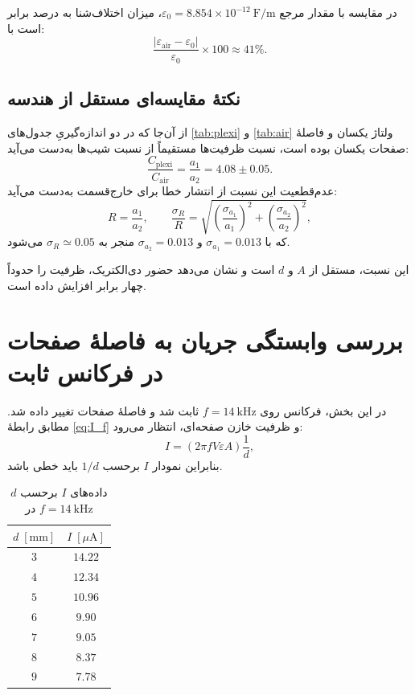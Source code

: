 \documentclass[a4paper, 11pt]{article}
\begin{document}
در مقایسه با مقدار مرجع $\varepsilon_0=8.854\times 10^{-12}\ \mathrm{F/m}$، میزان اختلاف‌شنا به درصد برابر است با:
\[
\frac{|\varepsilon_{\mathrm{air}}-\varepsilon_0|}{\varepsilon_0}\times 100
\approx 41\%.
\]

\subsection*{نکتهٔ مقایسه‌ای مستقل از هندسه}
از آن‌جا که در دو اندازه‌گیریِ جدول‌های \ref{tab:plexi} و \ref{tab:air} ولتاژ یکسان و فاصلهٔ صفحات یکسان بوده است، نسبت ظرفیت‌ها مستقیماً از نسبت شیب‌ها به‌دست می‌آید:
\[
\frac{C_{\mathrm{plexi}}}{C_{\mathrm{air}}}=\frac{a_1}{a_2}=4.08\pm 0.05.
\]
عدم‌قطعیت این نسبت از انتشار خطا برای خارج‌قسمت به‌دست می‌آید:
\[
R=\frac{a_1}{a_2},
\qquad
\frac{\sigma_R}{R}=\sqrt{\left(\frac{\sigma_{a_1}}{a_1}\right)^2+\left(\frac{\sigma_{a_2}}{a_2}\right)^2},
\]
که با \(\sigma_{a_1}=0.013\) و \(\sigma_{a_2}=0.013\) منجر به \(\sigma_R\simeq 0.05\) می‌شود.

این نسبت، مستقل از $A$ و $d$ است و نشان می‌دهد حضور دی‌الکتریک، ظرفیت را حدوداً چهار برابر افزایش داده است.

\section{بررسی وابستگی جریان به فاصلهٔ صفحات در فرکانس ثابت}

در این بخش، فرکانس روی $f=14~\mathrm{kHz}$ ثابت شد و فاصلهٔ صفحات تغییر داده شد. مطابق رابطهٔ \eqref{eq:I_f} و ظرفیت خازن صفحه‌ای، انتظار می‌رود:
\[
I = \left(2\pi f V \varepsilon A\right)\frac{1}{d},
\]
بنابراین نمودار $I$ برحسب $1/d$ باید خطی باشد.

\begin{table}[h!]
\caption{داده‌های $I$ برحسب $d$ در $f=14~\mathrm{kHz}$}
\label{tab:d}
\centering
\begin{tabular}{cc}
\hline
$d\;[\mathrm{mm}]$ & $I\;[\mu\mathrm{A}]$ \\
\hline
$3$ & $14.22$ \\
$4$ & $12.34$ \\
$5$ & $10.96$ \\
$6$ & $9.90$ \\
$7$ & $9.05$ \\
$8$ & $8.37$ \\
$9$ & $7.78$ \\
\hline
\end{tabular}
\end{table}
\end{document}
